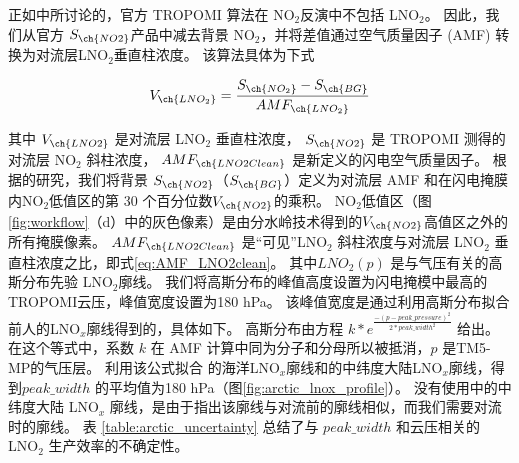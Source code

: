 正如\citet{Zhang.2022a}中所讨论的，官方 TROPOMI 算法在 NO$_2$反演中不包括 LNO$_2$。
因此，我们从官方 $S_{\ch{NO2}}$产品中减去背景 NO$_2$，并将差值通过空气质量因子 (AMF) 转换为对流层LNO$_2$垂直柱浓度。
该算法具体为下式


\begin{equation} \label{eq:arctic_LNO2}
V_{\ch{LNO_2}} = \frac{S_{\ch{NO_2}} - S_{\ch{BG}}}{AMF_{\ch{LNO_2}}}
\end{equation}


其中 $V_{\ch{LNO2}}$ 是对流层 LNO$_2$ 垂直柱浓度，
$S_{\ch{NO2}}$ 是 TROPOMI 测得的对流层 NO$_2$ 斜柱浓度，
$AMF_{\ch{LNO2Clean}}$ 是新定义的闪电空气质量因子。
根据\citet{Allen.2021a}的研究，我们将背景 $S_{\ch{NO2}}$（$S_{\ch{BG}}$）定义为对流层 AMF 和在闪电掩膜内NO$_2$低值区的第 30 个百分位数$V_{\ch{NO2}}$的乘积。
NO$_2$低值区（图 \ref{fig:workflow}（d）中的灰色像素）是由分水岭技术得到的$V_{\ch{NO2}}$高值区之外的所有掩膜像素。
$AMF_{\ch{LNO2Clean}}$ 是“可见”LNO$_2$ 斜柱浓度与对流层 LNO$_2$ 垂直柱浓度之比，即式\ref{eq:AMF_LNO2clean}。
其中$LNO_2(p)$ 是与气压有关的高斯分布先验 LNO$_2$廓线。
我们将高斯分布的峰值高度设置为闪电掩模中最高的TROPOMI云压，峰值宽度设置为180 hPa。
该峰值宽度是通过利用高斯分布拟合前人的LNO$_x$廓线得到的，具体如下。
高斯分布由方程 $k*e^\frac{{-{(p - peak\_pressure)}^2}}{2*peak\_width^{2}}$ 给出。
在这个等式中，系数 $k$ 在 AMF 计算中同为分子和分母所以被抵消，$p$ 是TM5-MP的气压层。
利用该公式拟合 \citet{Ott.2010} 的海洋LNO$_x$廓线和\citet{Luo.2017}的中纬度大陆LNO$_x$廓线，得到$peak\_width$ 的平均值为180 hPa（图\ref{fig:arctic_lnox_profile}）。
没有使用\citet{Ott.2010}中的中纬度大陆 LNO$_x$ 廓线，是由于\citet{Luo.2017}指出该廓线与对流前的廓线相似，而我们需要对流时的廓线。
表 \ref{table:arctic_uncertainty} 总结了与 $peak\_width$ 和云压相关的 LNO$_2$ 生产效率的不确定性。

